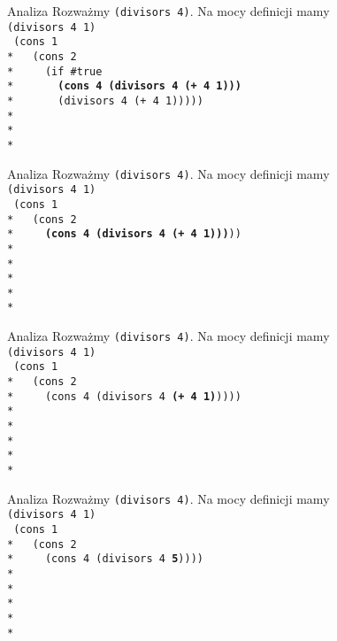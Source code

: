 \begin{frame}{Analiza}
  Rozważmy \texttt{(divisors 4)}. Na mocy definicji mamy\\
  \texttt{(divisors 4 1)}\\
  \texttt{
(cons 1 \\*
\ \ (cons 2 \\*
\ \ \ \ (if \#true\\*
\ \ \ \ \ \ \textbf{(cons 4 (divisors 4 (+ 4 1)))}\\*
\ \ \ \ \ \ (divisors 4 (+ 4 1)))))\\*
\ \\*
\ \\*
  }
\end{frame}

\begin{frame}{Analiza}
  Rozważmy \texttt{(divisors 4)}. Na mocy definicji mamy\\
  \texttt{(divisors 4 1)}\\
  \texttt{
(cons 1 \\*
\ \ (cons 2 \\*
\ \ \ \ \textbf{(cons 4 (divisors 4 (+ 4 1)))}))\\*
\ \\*
\ \\*
\ \\*
\ \\*
  }
\end{frame}

\begin{frame}{Analiza}
  Rozważmy \texttt{(divisors 4)}. Na mocy definicji mamy\\
  \texttt{(divisors 4 1)}\\
  \texttt{
(cons 1 \\*
\ \ (cons 2 \\*
\ \ \ \ (cons 4 (divisors 4 \textbf{(+ 4 1)}))))\\*
\ \\*
\ \\*
\ \\*
\ \\*
  }
\end{frame}

\begin{frame}{Analiza}
  Rozważmy \texttt{(divisors 4)}. Na mocy definicji mamy\\
  \texttt{(divisors 4 1)}\\
  \texttt{
(cons 1 \\*
\ \ (cons 2 \\*
\ \ \ \ (cons 4 (divisors 4 \textbf{5}))))\\*
\ \\*
\ \\*
\ \\*
\ \\*
  }
\end{frame}

